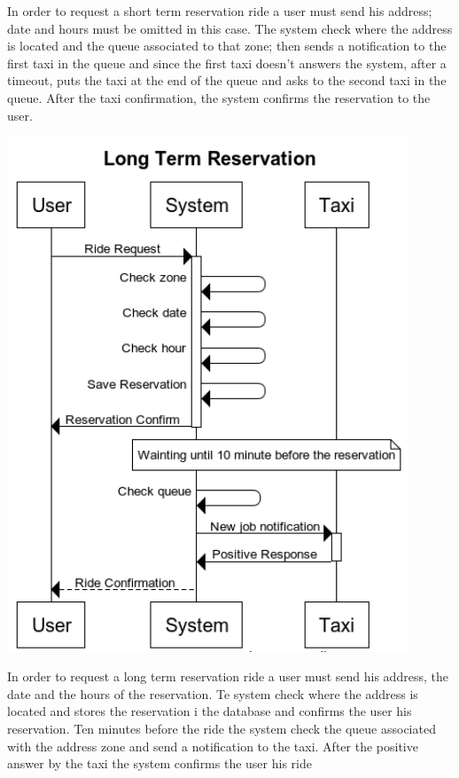 	In order to request a short term reservation ride a user must send his address; date and hours must be omitted in this case. The system check where the address is located and the queue associated to that zone; then sends a notification to the first taxi in the queue and since the first taxi doesn't answers the system, after a timeout, puts the taxi at the end of the queue and asks to the second taxi in the queue. After the taxi confirmation, the system confirms the reservation to the user.
		\newpage
	\begin{center}
		\includegraphics[width=0.90\textwidth]{./images/Long_Term_Reservation}
	\end{center}
	In order to request a long term reservation ride a user must send his address, the date and the hours of the reservation. Te system check where the address is located and stores the reservation i the database and confirms the user his reservation. Ten minutes before the ride the system check the queue associated with the address zone and send a notification to the taxi. After the positive answer by the taxi the system confirms the user his ride